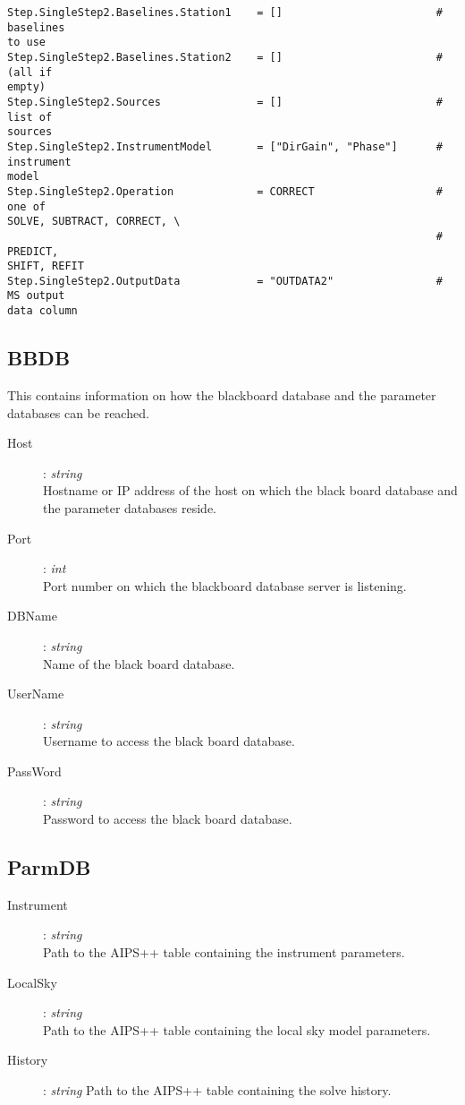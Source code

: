 \documentclass[10pt]{lofar}
\begin{document}
{\begin{verbatim}
Step.SingleStep2.Baselines.Station1    = []                        # baselines
to use
Step.SingleStep2.Baselines.Station2    = []                        # (all if
empty)
Step.SingleStep2.Sources               = []                        # list of
sources
Step.SingleStep2.InstrumentModel       = ["DirGain", "Phase"]      # instrument
model
Step.SingleStep2.Operation             = CORRECT                   # one of
SOLVE, SUBTRACT, CORRECT, \
                                                                   # PREDICT,
SHIFT, REFIT
Step.SingleStep2.OutputData            = "OUTDATA2"                # MS output
data column
\end{verbatim}
}

\subsection*{BBDB}
\label{app-bbdb}
This contains information on how the blackboard database and the parameter
databases can be reached.
\begin{description}
\item [Host] : \emph{string} \\
    Hostname or IP address of the host on which the black board database and the
parameter databases reside. 
\item [Port] : \emph{int} \\
    Port number on which the blackboard database server is listening. 
\item [DBName] : \emph{string} \\
    Name of the black board database. 
\item [UserName] : \emph{string} \\
    Username to access the black board database. 
\item [PassWord] : \emph{string} \\
    Password to access the black board database. 
\end{description}

\subsection*{ParmDB}
\label{app-parmdb}
\begin{description}
\item [Instrument] : \emph{string} \\
    Path to the AIPS++ table containing the instrument parameters. 
\item [LocalSky] : \emph{string} \\
    Path to the AIPS++ table containing the local sky model parameters. 
\item [History] : \emph{string}
    Path to the AIPS++ table containing the solve history. 
\end{description}
\end{document}
